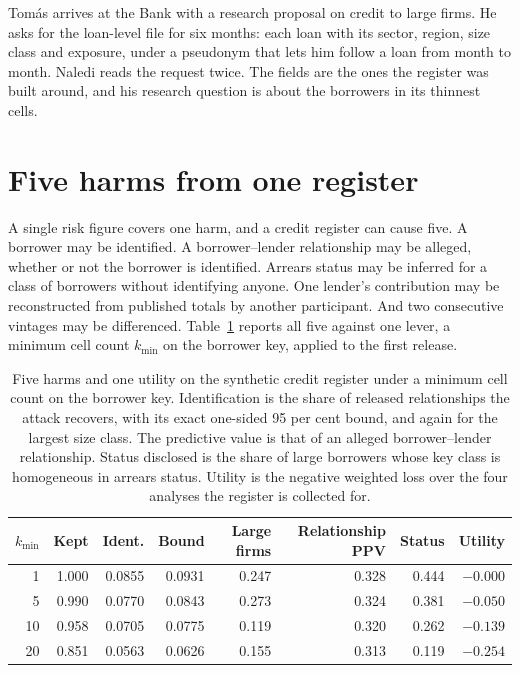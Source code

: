 Tomás arrives at the Bank with a research proposal on credit to large firms. He
asks for the loan-level file for six months: each loan with its sector, region,
size class and exposure, under a pseudonym that lets him follow a loan from month to
month. Naledi reads the request twice. The fields are the ones the register was
built around, and his research question is about the borrowers in its thinnest
cells.

\section{Five harms from one register}\label{c13:sec-harms}

A single risk figure covers one harm, and a credit register can cause five. A
borrower may be identified. A borrower--lender relationship may be alleged, whether
or not the borrower is identified. Arrears status may be inferred for a class of
borrowers without identifying anyone. One lender's contribution may be reconstructed
from published totals by another participant. And two consecutive vintages may be
differenced. Table~\ref{c13:tab-harms} reports all five against one lever, a minimum
cell count $k_{\min}$ on the borrower key, applied to the first release.

\begin{table}[ht]
\centering
\caption{Five harms and one utility on the synthetic credit register under a minimum
cell count on the borrower key. Identification is the share of released
relationships the attack recovers, with its exact one-sided 95 per cent bound, and
again for the largest size class. The predictive value is that of an alleged
borrower--lender relationship. Status disclosed is the share of large borrowers whose
key class is homogeneous in arrears status. Utility is the negative weighted loss
over the four analyses the register is collected for.}
\label{c13:tab-harms}
\small\setlength{\tabcolsep}{4pt}
\begin{tabular}{rrrrrrrr}
\toprule
$k_{\min}$ & Kept & Ident. & Bound & Large firms & Relationship PPV & Status & Utility \\
\midrule
1  & 1.000 & 0.0855 & 0.0931 & 0.247 & 0.328 & 0.444 & $-0.000$ \\
5  & 0.990 & 0.0770 & 0.0843 & 0.273 & 0.324 & 0.381 & $-0.050$ \\
10 & 0.958 & 0.0705 & 0.0775 & 0.119 & 0.320 & 0.262 & $-0.139$ \\
20 & 0.851 & 0.0563 & 0.0626 & 0.155 & 0.313 & 0.119 & $-0.254$ \\
\bottomrule
\end{tabular}
\end{table}

